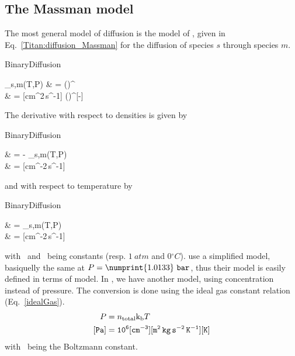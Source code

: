 \subsection{The Massman model}

The most general model of diffusion is the model of \citet{Massman1998}, given
in Eq.~\ref{Titan:diffusion_Massman} for the diffusion of species $s$ through
species $m$.
\begin{equationCode}{BinaryDiffusion}
\begin{split}
\diff_{s,m}(T,P)   &     =  \left(\right)^{} \\
\uu [cm^2\,s^{-1}] & \uu = [cm^2\,s^{-1}] \frac{[Pa]}{[Pa]} \left(\frac{[K]}{[K]}\right)^{[-]} \\
\end{split}
\label{Titan:diffusion_Massman}
\end{equationCode}
The derivative with respect to densities is given by
\begin{equationCode}{BinaryDiffusion}
\begin{split}
      & = - \diff_{s,m}(T,P)\\
\uu \frac{[cm^2\,s^{-1}]}{[cm^{-3}]} & \uu = [cm^{-2}\,s^{-1}]\\ 
\end{split}
\label{Titan:diffusion_Massman_dn}
\end{equationCode}
and with respect to temperature by
\begin{equationCode}{BinaryDiffusion}
\begin{split}
       & =   \diff_{s,m}(T,P)\\
\uu \frac{[cm^2\,s^{-1}]}{[K]} & \uu = [cm^{-2}\,s^{-1}]\frac{[-]}{[K]}\\ 
\end{split}
\label{Titan:diffusion_Massman_dT}
\end{equationCode}
%
with \Pz\ and \Tz\ being constants (resp. $1~\unit{atm}$ and $0\unit{^\circ C}$).
\citet{Wakeham1973} use a simplified model, basiquelly the same at $P=\numprint{1.0133}~\unit{bar}$, thus
their model is easily defined in terms of \citet{Massman1998} model. In \citet{WilsonPhD,Haye2005},
we have another model, using concentration instead of pressure. The conversion is done
using the ideal gas constant relation (Eq.~\ref{idealGas}).
\begin{equation}
\begin{split}
P        & = n_\text{total}\text{k}_\text{b} T \\
\tt [Pa] & = \tt 10^{6} [cm^{-3}][\mathtt{m^2\,kg\,s^{-2}\,K^{-1}}] [K]
\end{split}
\label{idealGas}
\end{equation}
with \kb\ being the Boltzmann constant.

